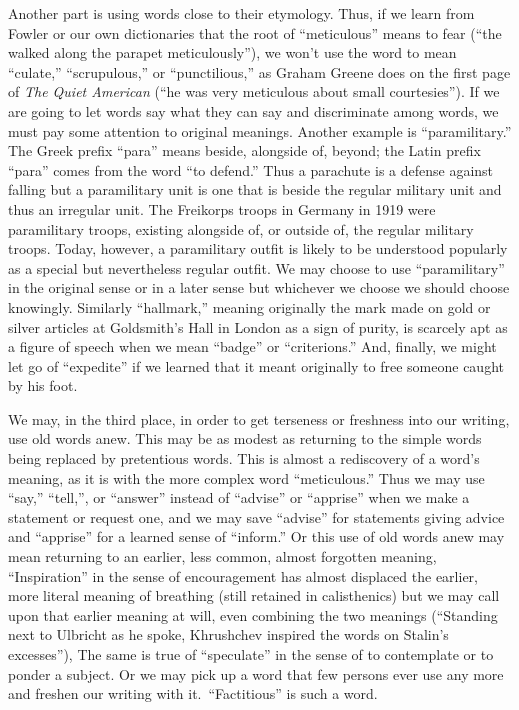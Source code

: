 \documentclass[
    oneside,
    11pt,
]{memoir}
\begin{document}
Another part is using words close to their etymology. Thus, if we learn from Fowler or our own dictionaries that the root of \enquote{meticulous} means to fear (\enquote{the walked along the parapet meticulously}), we won't use the word to mean \enquote{culate,} \enquote{scrupulous,} or \enquote{punctilious,} as Graham Greene does on the first page of \emph{The Quiet American} (\enquote{he was very meticulous about small courtesies}). If we are going to let words say what they can say and discriminate among words, we must pay some attention to original meanings. Another example is \enquote{paramilitary.} The Greek prefix \enquote{para} means beside, alongside of, beyond; the Latin prefix \enquote{para} comes from the word \enquote{to defend.} Thus a parachute is a defense against falling but a paramilitary unit is one that is beside the regular military unit and thus an irregular unit. The Freikorps troops in Germany in 1919 were paramilitary troops, existing alongside of, or outside of, the regular military troops. Today, however, a paramilitary outfit is likely to be understood popularly as a special but nevertheless regular outfit. We may choose to use \enquote{paramilitary} in the original sense or in a later sense but whichever we choose we should choose knowingly. Similarly \enquote{hallmark,} meaning originally the mark made on gold or silver articles at Goldsmith's Hall in London as a sign of purity, is scarcely apt as a figure of speech when we mean \enquote{badge} or \enquote{criterions.} And, finally, we might let go of \enquote{expedite} if we learned that it meant originally to free someone caught by his foot.

We may, in the third place, in order to get terseness or freshness into our writing, use old words anew. This may be as modest as returning to the simple words being replaced by pretentious words. This is almost a rediscovery of a word's meaning, as it is with the more complex word \enquote{meticulous.} Thus we may use \enquote{say,} \enquote{tell,}, or \enquote{answer} instead of \enquote{advise} or \enquote{apprise} when we make a statement or request one, and we may save \enquote{advise} for statements giving advice and \enquote{apprise} for a learned sense of \enquote{inform.} Or this use of old words anew may mean returning to an earlier, less common, almost forgotten meaning, \enquote{Inspiration} in the sense of encouragement has almost displaced the earlier, more literal meaning of breathing (still retained in calisthenics) but we may call upon that earlier meaning at will, even combining the two meanings (\enquote{Standing next to Ulbricht as he spoke, Khrushchev inspired the words on Stalin's excesses}), The same is true of \enquote{speculate} in the sense of to contemplate or to ponder a subject. Or we may pick up a word that few persons ever use any more and freshen our writing with it.\ \enquote{Factitious} is such a word.
\end{document}
